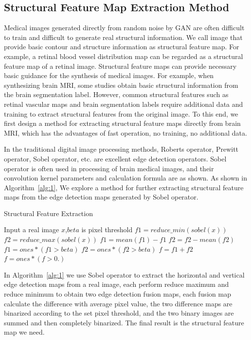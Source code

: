 \documentclass[letterpaper]{article} %
\begin{document}
\subsection{Structural Feature Map Extraction Method}

Medical images generated directly from random noise by GAN are often difficult to train and difficult to generate real structural information. We call image that provide basic contour and structure information as structural feature map. For example, a retinal blood vessel distribution map can be regarded as a structural feature map of a retinal image\cite{41costa2017towards}. Structural feature maps can provide necessary basic guidance for the synthesis of medical images. For example, when synthesizing brain MRI, some studies obtain basic structural information from the brain segmentation label\cite{4shin2018medical}. However, common structural features such as retinal vascular maps and brain segmentation labels require additional data and training to extract structural features from the original image. To this end, we first design a method for extracting structural feature maps directly from brain MRI, which has the advantages of fast operation, no training, no additional data. 

In the traditional digital image processing methods, Roberts operator, Prewitt operator, Sobel operator, etc. are excellent edge detection operators. Sobel operator is often used in processing of brain medical images, and their convolution kernel parameters and calculation formula are as shown. As shown in Algorithm~\ref{alg:1}, We explore a method for further extracting structural feature maps from the edge detection maps generated by Sobel operator.
\begin{algorithm}
	\caption{Structural Feature Extraction}
	\label{alg:1}
	\begin{algorithmic}[1]
		\State Input a real image $x$,$beta$ is pixel threshold
		\State $f1 = reduce\_min(sobel(x))$
		\State $f2 = reduce\_max(sobel(x))$
		\State $f1 = mean(f1) - f1$
		\State $f2 = f2 - mean(f2)$
		\State $f1 = ones * (f1 > beta)$
		\State $f2 = ones * (f2 > beta)$
		\State $f = f1 + f2$
		\State $f = ones * (f > 0.)$
	\end{algorithmic}  
\end{algorithm}

In Algorithm~\ref{alg:1} we use Sobel operator to extract the horizontal and vertical edge detection maps from a real image, each perform reduce maximum and reduce minimum to obtain two edge detection fusion maps, each fusion map calculate the difference with average pixel value, the two difference maps are binarized according to the set pixel threshold, and the two binary images are summed and then completely binarized. The final result is the structural feature map we need.
\end{document}
